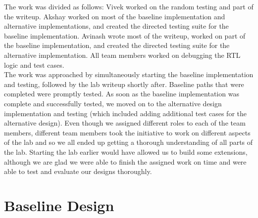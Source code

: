 \documentclass[10pt]{article}
\begin{document}
The work was divided as follows:
Vivek worked on the random testing and part of the writeup.
Akshay worked on most of the baseline implementation and alternative implementations, and created the directed testing suite for the baseline implementation.
Avinash wrote most of the writeup, worked on part of the baseline implementation, and created the directed testing suite for the alternative implementation.
All team members worked on debugging the RTL logic and test cases. \\

The work was approached by simultaneously starting the baseline implementation and testing, followed by the lab writeup shortly after. Baseline paths that were completed were promptly tested. As soon as the baseline implementation was complete and successfully tested, we moved on to the alternative design implementation and testing (which included adding additional test cases for the alternative design). Even though we assigned different roles to each of the team members, different team members took the initiative to work on different aspects of the lab and so we all ended up getting a thorough understanding of all parts of the lab. Starting the lab earlier would have allowed us to build some extensions, although we are glad we were able to finish the assigned work on time and were able to test and evaluate our designs thoroughly. 


\section{Baseline Design}
\end{document}

